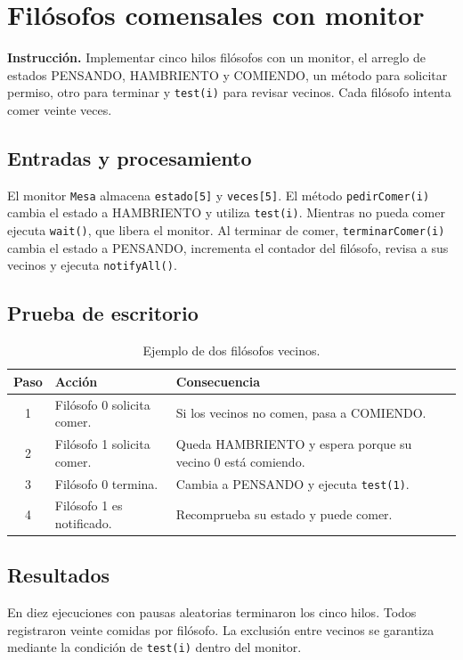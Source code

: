 \documentclass[12pt,oneside]{book}
\begin{document}
\chapter{Filósofos comensales con monitor}
\textbf{Instrucción.} Implementar cinco hilos filósofos con un monitor, el arreglo de estados PENSANDO, HAMBRIENTO y COMIENDO, un método para solicitar permiso, otro para terminar y \texttt{test(i)} para revisar vecinos. Cada filósofo intenta comer veinte veces.

\section{Entradas y procesamiento}
El monitor \texttt{Mesa} almacena \texttt{estado[5]} y \texttt{veces[5]}. El método \texttt{pedirComer(i)} cambia el estado a HAMBRIENTO y utiliza \texttt{test(i)}. Mientras no pueda comer ejecuta \texttt{wait()}, que libera el monitor. Al terminar de comer, \texttt{terminarComer(i)} cambia el estado a PENSANDO, incrementa el contador del filósofo, revisa a sus vecinos y ejecuta \texttt{notifyAll()}.

\section{Prueba de escritorio}
\begin{table}[H]\centering\caption{Ejemplo de dos filósofos vecinos.}
\begin{tabularx}{\textwidth}{c X X}\toprule
Paso & Acción & Consecuencia\\\midrule
1 & Filósofo 0 solicita comer. & Si los vecinos no comen, pasa a COMIENDO.\\
2 & Filósofo 1 solicita comer. & Queda HAMBRIENTO y espera porque su vecino 0 está comiendo.\\
3 & Filósofo 0 termina. & Cambia a PENSANDO y ejecuta \texttt{test(1)}.\\
4 & Filósofo 1 es notificado. & Recomprueba su estado y puede comer.\\\bottomrule
\end{tabularx}\end{table}

\section{Resultados}
En diez ejecuciones con pausas aleatorias terminaron los cinco hilos. Todos registraron veinte comidas por filósofo. La exclusión entre vecinos se garantiza mediante la condición de \texttt{test(i)} dentro del monitor.
\end{document}
